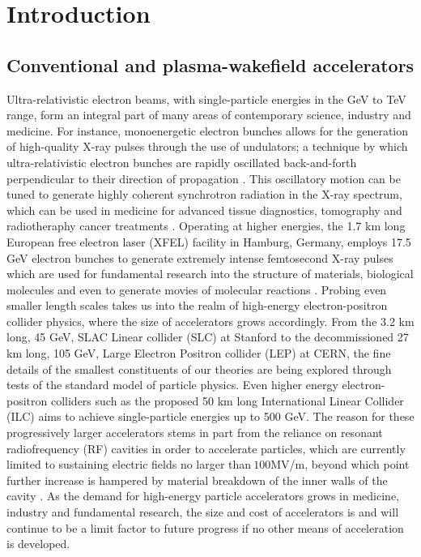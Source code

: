 \chapter{Introduction}
\section{Conventional and plasma-wakefield accelerators}\vspace{-8pt}

Ultra-relativistic electron beams, with single-particle energies in the GeV to TeV range, form an integral part of many areas of contemporary science, industry and medicine. 
For instance, monoenergetic electron bunches allows for the generation of high-quality X-ray pulses through the use of undulators; a technique by which ultra-relativistic electron bunches are rapidly oscillated back-and-forth perpendicular to their direction of propagation \cite{xfel}. This oscillatory motion can be tuned to generate highly coherent synchrotron radiation in the X-ray spectrum, which can be used in medicine for advanced tissue diagnostics, tomography and radiotheraphy cancer treatments \cite{Attwood}. Operating at higher energies, the 1.7 km long European free electron laser (XFEL) facility in Hamburg, Germany, employs 17.5 GeV electron bunches to generate extremely intense femtosecond X-ray pulses which are used for fundamental research into the structure of materials, biological molecules and even to generate movies of molecular reactions \cite{xfel}. Probing even smaller length scales takes us into the realm of high-energy electron-positron collider physics, where the size of accelerators grows accordingly. From the 3.2 km long, 45 GeV, SLAC Linear collider (SLC) at Stanford to the decommissioned 27 km long, 105 GeV, Large Electron Positron collider (LEP) at CERN, the fine details of the smallest constituents of our theories are being explored through tests of the standard model of particle physics. Even higher energy electron-positron colliders such as the proposed 50 km long International Linear Collider (ILC) aims to achieve single-particle energies up to 500 GeV. The reason for these progressively larger accelerators stems in part from the reliance on resonant radiofrequency (RF) cavities in order to accelerate particles, which are currently limited to sustaining electric fields no larger than$~100$MV/m, beyond which point further increase is hampered by material breakdown of the inner walls of the cavity \cite{Insepov2008}. As the demand for high-energy particle accelerators grows in medicine, industry and fundamental research, the size and cost of accelerators is and will continue to be a limit factor to future progress if no other means of acceleration is developed.\\
